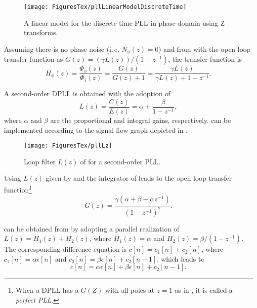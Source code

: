 \begin{figure}[htbp]
\centering
\texttt{[image: FiguresTex/pllLinearModelDiscreteTime]}
\caption{A linear model for the discrete-time PLL in phase-domain using Z transforms.\label{fig:pllLinearModelDiscreteTime}}
\end{figure}

Assuming there is no phase noise (i.\,e. $N_{\phi}(z)=0$) and from  with the open loop transfer function as $G(z)=(\gamma L(z))/(1-z^{-1})$, the transfer function is
\begin{equation}
H_{\phi}(z) = \frac{\Phi_o(z)}{\Phi_i(z)} = \frac{G(z)}{G(z)+1} = \frac{\gamma L(z)}{\gamma L(z)+1-z^{-1}}.
\label{eq:pllTransferFunctionDiscreteTime}
\end{equation}

A second-order DPLL is obtained with the adoption of
\begin{equation}
L(z) = \frac{C(z)}{E(z)} = \alpha + \frac{\beta}{1-z^{-1}},
\label{eq:pllLzSecondOrder}
\end{equation}
where $\alpha$ and $\beta$ are the proportional and integral gains, respectively.
 can be implemented according to the signal flow graph
depicted in .

\begin{figure}[htbp]
	\centering
		\texttt{[image: FiguresTex/pllLz]}		
	\caption{Loop filter $L(z)$ of  for a second-order PLL.\label{fig:pllLz}}
\end{figure}

Using $L(z)$ given by  and the integrator of  leads
to the open loop transfer function\footnote{When a DPLL has a $G(Z)$ with all poles at $z=1$ as in , it is called a \emph{perfect PLL}.}
\begin{equation}
G(z) = \frac{\gamma (\alpha + \beta - \alpha z^{-1})}{(1-z^{-1})^2}.
\label{eq:pllOpenLoop2order}
\end{equation}

 can be obtained from  by adopting a parallel 
realization of $L(z)=H_1(z) + H_2(z)$, where $H_1(z)=\alpha$ and $H_2(z)=\beta/(1-z^{-1})$.
The corresponding difference equation is $c[n] = c_1[n] + c_2[n]$, where
$c_1[n]=\alpha \epsilon[n]$ and $c_2[n]=\beta \epsilon[n] + c_2[n-1]$, which leads to
\begin{equation}
c[n] = \alpha \epsilon[n] + \beta \epsilon[n] + c_2[n-1].
\label{eq:pllDifferenceEq}
\end{equation}

